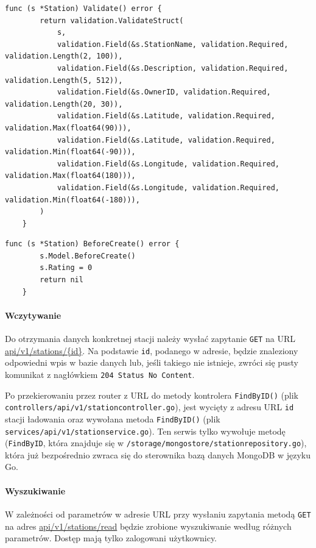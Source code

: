 \begin{lstlisting}[label=list:validation_station,caption=Walidacja danych stacji ładowania,basicstyle=\tiny\ttfamily]
    func (s *Station) Validate() error {
        return validation.ValidateStruct(
            s,
            validation.Field(&s.StationName, validation.Required, validation.Length(2, 100)),
            validation.Field(&s.Description, validation.Required, validation.Length(5, 512)),
            validation.Field(&s.OwnerID, validation.Required, validation.Length(20, 30)),
            validation.Field(&s.Latitude, validation.Required, validation.Max(float64(90))),
            validation.Field(&s.Latitude, validation.Required, validation.Min(float64(-90))),
            validation.Field(&s.Longitude, validation.Required, validation.Max(float64(180))),
            validation.Field(&s.Longitude, validation.Required, validation.Min(float64(-180))),
        )
    }
\end{lstlisting}

\begin{lstlisting}[label=list:before_create_station,caption=Uzupełnienie danych systemowych dotyczących,basicstyle=\tiny\ttfamily]
    func (s *Station) BeforeCreate() error {
        s.Model.BeforeCreate()
        s.Rating = 0
        return nil
    }
\end{lstlisting}

\paragraph{Wczytywanie\newline}
Do otrzymania danych konkretnej stacji należy wysłać zapytanie \texttt{GET} na URL \url{api/v1/stations/{id}}.
Na podstawie \texttt{id}, podanego w adresie, będzie znaleziony odpowiedni wpis w bazie danych lub, jeśli takiego nie istnieje, zwróci się pusty komunikat z nagłówkiem \texttt{204 Status No Content}.

Po przekierowaniu przez router z URL do metody kontrolera \texttt{FindByID()} (plik \texttt{controllers/api/v1/stationcontroller.go}), jest wycięty z adresu URL \texttt{id} stacji ładowania oraz wywołana metoda \texttt{FindByID()} (plik \texttt{services/api/v1/stationservice.go}).
Ten serwis tylko wywołuje metodę (\texttt{FindByID}, która znajduje się w \texttt{/storage/mongostore/stationrepository.go}), która już bezpośrednio zwraca się do sterownika bazą danych MongoDB w języku Go.
%
\paragraph{Wyszukiwanie\newline}
W zależności od parametrów w adresie URL przy wysłaniu zapytania metodą \texttt{GET} na adres \url{api/v1/stations/read} będzie zrobione wyszukiwanie według różnych parametrów.
Dostęp mają tylko zalogowani użytkownicy.

